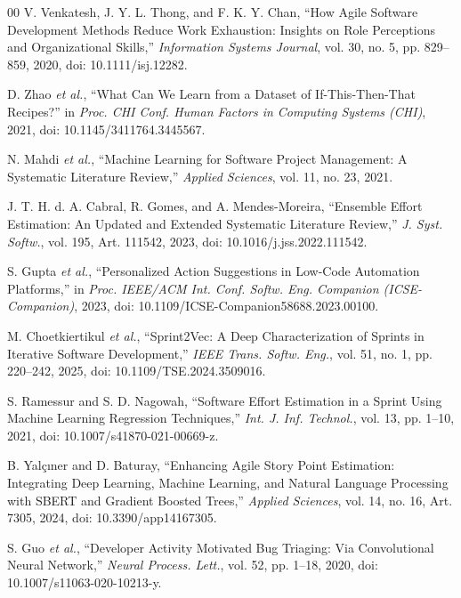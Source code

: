 \documentclass[conference]{IEEEtran}
\begin{document}
\begin{thebibliography}{00}
V. Venkatesh, J. Y. L. Thong, and F. K. Y. Chan, ``How Agile Software Development Methods Reduce Work Exhaustion: Insights on Role Perceptions and Organizational Skills,''
\textit{Information Systems Journal}, vol. 30, no. 5, pp. 829--859, 2020,
doi: 10.1111/isj.12282.

D. Zhao \textit{et al.}, ``What Can We Learn from a Dataset of If-This-Then-That Recipes?''
in \textit{Proc. CHI Conf. Human Factors in Computing Systems (CHI)}, 2021,
doi: 10.1145/3411764.3445567.

N. Mahdi \textit{et al.}, ``Machine Learning for Software Project Management: A Systematic Literature Review,''
\textit{Applied Sciences}, vol. 11, no. 23, 2021.

J. T. H. d. A. Cabral, R. Gomes, and A. Mendes-Moreira,
``Ensemble Effort Estimation: An Updated and Extended Systematic Literature Review,''
\textit{J. Syst. Softw.}, vol. 195, Art. 111542, 2023,
doi: 10.1016/j.jss.2022.111542.


S. Gupta \textit{et al.}, ``Personalized Action Suggestions in Low-Code Automation Platforms,''
in \textit{Proc. IEEE/ACM Int. Conf. Softw. Eng. Companion (ICSE-Companion)}, 2023,
doi: 10.1109/ICSE-Companion58688.2023.00100.

M. Choetkiertikul \textit{et al.},
``Sprint2Vec: A Deep Characterization of Sprints in Iterative Software Development,''
\textit{IEEE Trans. Softw. Eng.}, vol. 51, no. 1, pp. 220--242, 2025,
doi: 10.1109/TSE.2024.3509016.

S. Ramessur and S. D. Nagowah,
``Software Effort Estimation in a Sprint Using Machine Learning Regression Techniques,''
\textit{Int. J. Inf. Technol.}, vol. 13, pp. 1--10, 2021,
doi: 10.1007/s41870-021-00669-z.

B. Yal\c{c}{\i}ner and D. Baturay,
``Enhancing Agile Story Point Estimation: Integrating Deep Learning, Machine Learning, and Natural Language Processing with SBERT and Gradient Boosted Trees,''
\textit{Applied Sciences}, vol. 14, no. 16, Art. 7305, 2024,
doi: 10.3390/app14167305.

S. Guo \textit{et al.}, ``Developer Activity Motivated Bug Triaging: Via Convolutional Neural Network,''
\textit{Neural Process. Lett.}, vol. 52, pp. 1--18, 2020,
doi: 10.1007/s11063-020-10213-y.


\end{thebibliography}
\end{document}
